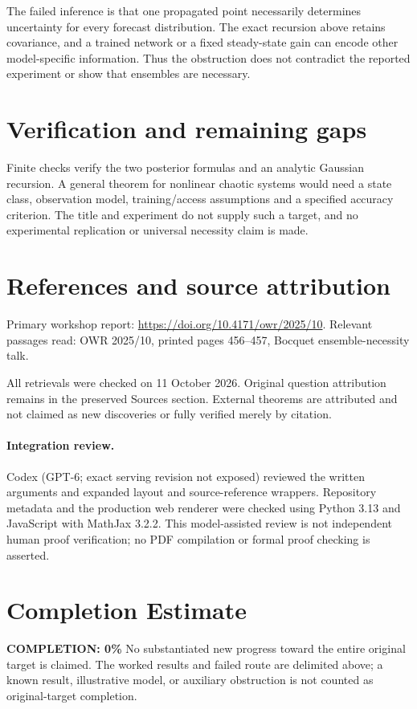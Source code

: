 \documentclass[11pt]{article}
\begin{document}
The failed inference is that one propagated point necessarily determines uncertainty for every forecast distribution. The exact recursion above retains covariance, and a trained network or a fixed steady-state gain can encode other model-specific information. Thus the obstruction does not contradict the reported experiment or show that ensembles are necessary.
\section{Verification and remaining gaps}
Finite checks verify the two posterior formulas and an analytic Gaussian recursion. A general theorem for nonlinear chaotic systems would need a state class, observation model, training/access assumptions and a specified accuracy criterion. The title and experiment do not supply such a target, and no experimental replication or universal necessity claim is made.

\section{References and source attribution}
Primary workshop report: \url{https://doi.org/10.4171/owr/2025/10}. Relevant passages read: OWR 2025/10, printed pages 456--457, Bocquet ensemble-necessity talk.

All retrievals were checked on 11 October 2026. Original question attribution remains in the preserved Sources section. External theorems are attributed and not claimed as new discoveries or fully verified merely by citation.


\paragraph{Integration review.} Codex (GPT-6; exact serving revision not exposed) reviewed the written arguments and expanded layout and source-reference wrappers. Repository metadata and the production web renderer were checked using Python 3.13 and JavaScript with MathJax 3.2.2. This model-assisted review is not independent human proof verification; no PDF compilation or formal proof checking is asserted.

\section{Completion Estimate}
\noindent\textbf{COMPLETION: 0\%}
No substantiated new progress toward the entire original target is claimed. The worked results and failed route are delimited above; a known result, illustrative model, or auxiliary obstruction is not counted as original-target completion.
\end{document}
